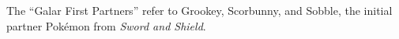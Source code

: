 \begin{tipbox}[title=Galar First Partners]
The ``Galar First Partners'' refer to Grookey, Scorbunny, and Sobble, the
initial partner Pokémon from \textit{Sword and Shield}.
\end{tipbox}
